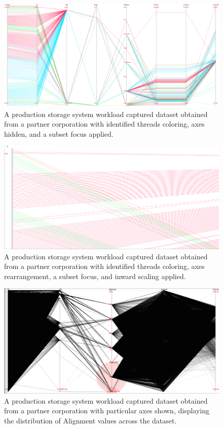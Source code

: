 \documentclass[12pt]{ucthesis}
\begin{document}
\begin{figure}[h!]
 \centering
 \includegraphics[width=\textwidth]{images/15.jpg}
 \caption[Focus applied on a production workload with threads colored.]{A production storage system workload captured dataset obtained from a partner corporation with identified threads coloring, axes hidden, and a subset focus applied.}
\end{figure}

\begin{figure}[h!]
 \centering
 \includegraphics[width=\textwidth]{images/16.jpg}
 \caption[Focus applied on a production workload with threads colored.]{A production storage system workload captured dataset obtained from a partner corporation with identified threads coloring, axes rearrangement, a subset focus, and inward scaling applied.}
\end{figure}

\begin{figure}[h!]
 \centering
 \includegraphics[width=\textwidth]{images/17.jpg}
 \caption[Production workload displaying Alignment distribution.]{A production storage system workload captured dataset obtained from a partner corporation with particular axes shown, displaying the distribution of Alignment values across the dataset.}
\end{figure}
\end{document}
